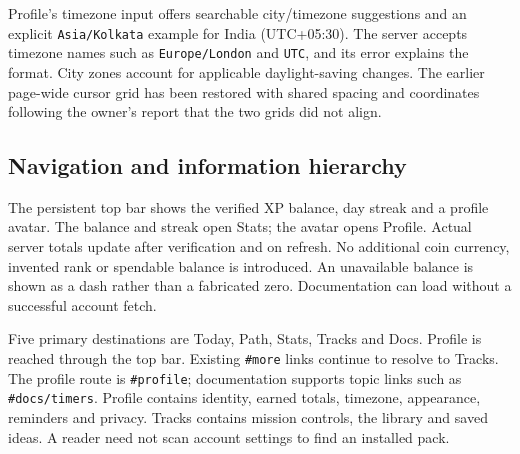 Profile's timezone input offers searchable city/timezone suggestions and an explicit
\texttt{Asia/Kolkata} example for India (UTC+05:30). The server accepts timezone
names such as \texttt{Europe/London} and \texttt{UTC}, and its error explains the
format. City zones account for applicable daylight-saving changes. The earlier
page-wide cursor grid has been restored with shared spacing and coordinates
following the owner's report that the two grids did not align.

\subsection{Navigation and information hierarchy}
The persistent top bar shows the verified XP balance, day streak and a profile avatar. The
balance and streak open Stats; the avatar opens Profile. Actual server totals update after
verification and on refresh. No additional coin currency, invented rank or
spendable balance is introduced. An unavailable balance is shown as a dash rather
than a fabricated zero. Documentation can load without a successful account fetch.

Five primary destinations are Today, Path, Stats, Tracks and Docs. Profile is
reached through the top bar. Existing \texttt{\#more} links continue to resolve to
Tracks. The profile route is \texttt{\#profile}; documentation supports topic links
such as \texttt{\#docs/timers}. Profile contains identity, earned totals, timezone,
appearance, reminders and privacy. Tracks contains mission controls, the library
and saved ideas. A reader need not scan account settings to find an installed pack.


